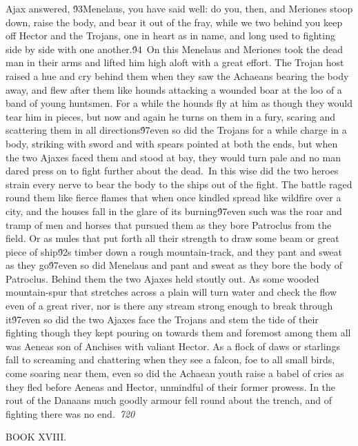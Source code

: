 {Ajax answered, \'93Menelaus, you have said well: do you, then, and Meriones stoop down, raise the body, and bear it out of the fray, while we two behind you keep off Hector and the Trojans, one in heart as in name, and long used to fighting side by side with one another.\'94\
On this Menelaus and Meriones took the dead man in their arms and lifted him high aloft with a great effort. The Trojan host raised a hue and cry behind them when they saw the Achaeans bearing the body away, and flew after them like hounds attacking a wounded boar at the loo of a band of young huntsmen. For a while the hounds fly at him as though they would tear him in pieces, but now and again he turns on them in a fury, scaring and scattering them in all directions\'97even so did the Trojans for a while charge in a body, striking with sword and with spears pointed at both the ends, but when the two Ajaxes faced them and stood at bay, they would turn pale and no man dared press on to fight further about the dead.\
In this wise did the two heroes strain every nerve to bear the body to the ships out of the fight. The battle raged round them like fierce flames that when once kindled spread like wildfire over a city, and the houses fall in the glare of its burning\'97even such was the roar and tramp of men and horses that pursued them as they bore Patroclus from the field. Or as mules that put forth all their strength to draw some beam or great piece of ship\'92s timber down a rough mountain-track, and they pant and sweat as they go\'97even so did Menelaus and pant and sweat as they bore the body of Patroclus. Behind them the two Ajaxes held stoutly out. As some wooded mountain-spur that stretches across a plain will turn water and check the flow even of a great river, nor is there any stream strong enough to break through it\'97even so did the two Ajaxes face the Trojans and stem the tide of their fighting though they kept pouring on towards them and foremost among them all was Aeneas son of Anchises with valiant Hector. As a flock of daws or starlings fall to screaming and chattering when they see a falcon, foe to all small birds, come soaring near them, even so did the Achaean youth raise a babel of cries as they fled before Aeneas and Hector, unmindful of their former prowess. In the rout of the Danaans much goodly armour fell round about the trench, and of fighting there was no end.\
\pard{}\sl720\qc{}

\fs48 \cf2 BOOK XVIII.\
\pard\pardeftab720\li1710\ri1710\sa64\qj\partightenfactor0

}
